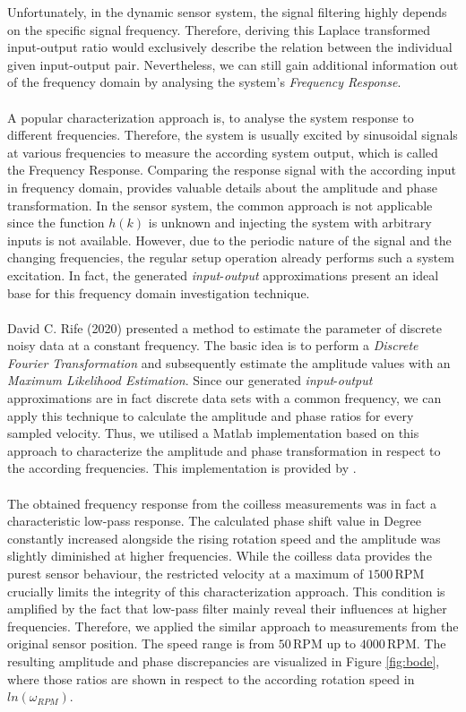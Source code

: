 \documentclass[english]{isasthesis}
\begin{document}
   			Unfortunately, in the dynamic sensor system, the signal filtering highly depends on the specific signal frequency. Therefore, deriving this Laplace transformed input-output ratio would exclusively describe the relation between the individual given input-output pair. Nevertheless, we can still gain additional information out of the frequency domain by analysing the system's \textit{Frequency Response}.\\ \\
   			A popular characterization approach is, to analyse the system response to different frequencies. Therefore, the system is usually excited by sinusoidal signals at various frequencies to measure the according system output, which is called the Frequency Response. Comparing the response signal with the according input in frequency domain, provides valuable details about the amplitude and phase transformation. In the sensor system, the common approach is not applicable since the function $h(k)$ is unknown and injecting the system with arbitrary inputs is not available. However, due to the periodic nature of the signal and the changing frequencies, the regular setup operation already performs such a system excitation. In fact, the generated \textit{input}-\textit{output} approximations present an ideal base for this frequency domain investigation technique. \\ \\
   			David C. Rife (2020) \cite{roberts2020signals} presented a method to estimate the parameter of discrete noisy data at a constant frequency. The basic idea is to perform a \textit{Discrete Fourier Transformation} and subsequently estimate the amplitude values with an \textit{Maximum Likelihood Estimation}. Since our generated \textit{input}-\textit{output} approximations are in fact discrete data sets with a common frequency, we can apply this technique to calculate the amplitude and phase ratios for every sampled velocity. Thus, we utilised a Matlab implementation based on this approach to characterize the amplitude and phase transformation in respect to the according frequencies. This implementation is provided by \cite{matlabamplitude}. \\ \\
   			The obtained frequency response from the coilless measurements was in fact a characteristic low-pass response. The calculated phase shift value in Degree constantly increased alongside the rising rotation speed and the amplitude was slightly diminished at higher frequencies. While the coilless data provides the purest sensor behaviour, the restricted velocity at a maximum of $1500\,$RPM crucially limits the integrity of this characterization approach. This condition is amplified by the fact that low-pass filter mainly reveal their influences at higher frequencies. Therefore, we applied the similar approach to measurements from the original sensor position. The speed range is from $50\,$RPM up to $4000\,$RPM. The resulting amplitude and phase discrepancies are visualized in Figure \ref{fig:bode}, where those ratios are shown in respect to the according rotation speed in $ln(\omega_{RPM})$.
\end{document}
